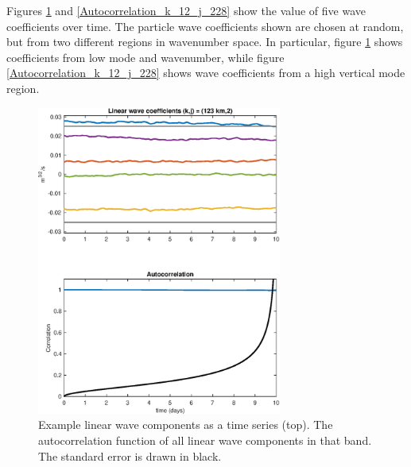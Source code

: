 \documentclass[10pt]{article}
\begin{document}
Figures \ref{Autocorrelation_k_8_j_2} and \ref{Autocorrelation_k_12_j_228} show the value of five wave coefficients over time. The particle wave coefficients shown are chosen at random, but from two different regions in wavenumber space. In particular, figure \ref{Autocorrelation_k_8_j_2} shows coefficients from low mode and wavenumber, while figure  \ref{Autocorrelation_k_12_j_228} shows wave coefficients from a high vertical mode region.

\begin{figure}[t]
  \centerline{\includegraphics[width=19pc,angle=0]{figures/Autocorrelation_k_8_j_2}}
  \caption{Example linear wave components as a time series (top). The autocorrelation function of all linear wave components in that band. The standard error is drawn in black.}
  \label{Autocorrelation_k_8_j_2}
\end{figure}
\end{document}
